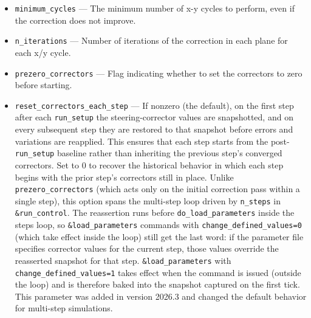 \documentclass[11pt]{article}
\begin{document}
\begin{itemize}
  have converged.
\item \verb|minimum_cycles| --- The minimum number of x-y cycles to perform, even if the correction does not improve.
\item \verb|n_iterations| --- Number of iterations of the correction in each plane for each x/y cycle.
\item \verb|prezero_correctors| --- Flag indicating whether to set the correctors to zero before starting.
\item \verb|reset_correctors_each_step| --- If nonzero (the default), on the first
step after each \verb|run_setup| the steering-corrector values
are snapshotted, and on every subsequent step they are restored to that snapshot
before errors and variations are reapplied.  This ensures that each step starts
from the post-\verb|run_setup| baseline rather than inheriting the previous step's
converged correctors.  Set to 0 to recover the historical behavior in which each
step begins with the prior step's correctors still in place.  Unlike
\verb|prezero_correctors| (which acts only on the initial correction pass within a
single step), this option spans the multi-step loop driven by \verb|n_steps| in
\verb|&run_control|.  The reassertion runs before \verb|do_load_parameters| inside
the steps loop, so \verb|&load_parameters| commands with
\verb|change_defined_values=0| (which take effect inside the loop) still get the
last word: if the parameter file specifies corrector values for the current step,
those values override the reasserted snapshot for that step.
\verb|&load_parameters| with \verb|change_defined_values=1| takes effect when the
command is issued (outside the loop) and is therefore baked into the snapshot
captured on the first tick.
This parameter was added in version 2026.3 and changed the default behavior for multi-step simulations.


\end{itemize}
\end{document}
